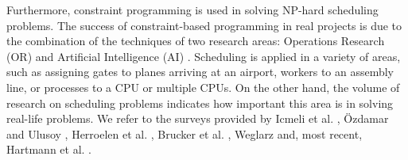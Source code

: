 Furthermore, constraint programming is used in solving NP-hard scheduling problems.
The success of constraint-based programming in real projects is due to the combination of the techniques of two research areas: Operations Research (OR) and Artificial Intelligence (AI) \cite{bartak2010constraint}.
%
Scheduling is applied in a variety of areas, such as assigning gates to planes arriving at an airport, workers to an assembly line, or processes to a CPU or multiple CPUs.
On the other hand, the volume of research on scheduling problems indicates how important this area is in solving real-life problems.
We refer to the surveys provided by
Icmeli et al. \cite{icmeli1993project},
Özdamar and Ulusoy \cite{ozdamar1995survey},
Herroelen et al. \cite{herroelen1998resource},
Brucker et al. \cite{brucker1999resource},
Weglarz \cite{weglarz2012project} and, most recent, 
Hartmann et al. \cite{hartmann2022updated}.
